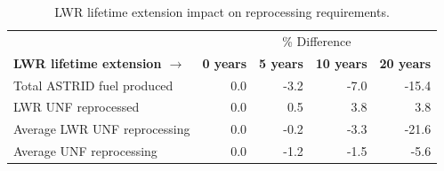 \begin{table}[h]
	\centering
	\caption{\gls{LWR} lifetime extension impact on reprocessing requirements.}
	\begin{tabular}{lrrrr}
		\hline
		& \multicolumn{4}{c}{\% Difference} \\
		\textbf{\gls{LWR} lifetime extension $\longrightarrow$}& \textbf{0 years}& \textbf{5 years} & \textbf{10 years} & \textbf{20 years} \\
		\hline
		Total \gls{ASTRID} fuel produced & 0.0 & -3.2 & -7.0 & -15.4 \\
		\gls{LWR} \gls{UNF} reprocessed & 0.0  & 0.5 & 3.8 & 3.8 \\
		Average \gls{LWR} \gls{UNF} reprocessing & 0.0 & -0.2 & -3.3 & -21.6 \\
		Average \gls{UNF} reprocessing & 0.0 & -1.2 & -1.5 & -5.6 \\
		\hline
	\end{tabular}
	\label{tab:ext_met}
\end{table}
